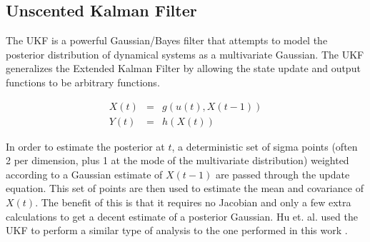 \subsection{Unscented Kalman Filter}
\label{sec:Unscented Kalman Filter}
The \ac{UKF} is a powerful Gaussian/Bayes filter that attempts
to model the posterior distribution of dynamical systems as a multivariate
Gaussian. The \ac{UKF} generalizes the Extended Kalman
Filter by allowing the state update and output functions to be arbitrary functions.

\begin{eqnarray}
X(t) &=& g(u(t), X(t-1))\\
Y(t) &=& h(X(t))
\end{eqnarray}

In order to estimate the posterior at $t$, a deterministic set of sigma points 
(often 2 per dimension, plus 1 at the mode of the multivariate distribution)
weighted according to a Gaussian estimate of $X(t-1)$ are passed through
the update equation. This set of points are then used to estimate the 
mean and covariance of $X(t)$. The benefit of this is that it requires
no Jacobian and only a few extra calculations to get a decent estimate of
a posterior Gaussian. Hu et. al. used the \ac{UKF} to  perform a similar type of analysis to
the one performed in this work \cite{Hu2009}. 

